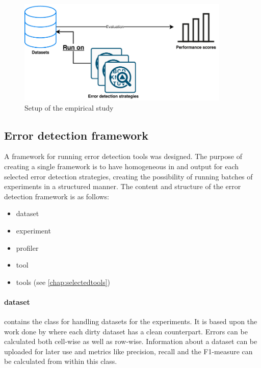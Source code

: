\begin{figure}[h]
    \centering
    \includegraphics[width=0.9\textwidth]{thesis/Figures/Method/PerformanceEstimation-Experiment.pdf}
    \caption{Setup of the empirical study}
    \label{fig:empiricalsetup}
\end{figure}

\subsection{Error detection framework}
A framework for running error detection tools was designed. The purpose of creating a single framework is to have homogeneous in and output for each selected error detection strategies, creating the possibility of running batches of experiments in a structured manner. 
The content and structure of the error detection framework is as follows:
\begin{itemize}[label=]
\item dataset
\item experiment
\item profiler
\item tool
\item tools (see \autoref{chap:selectedtools})
\end{itemize}

\paragraph{dataset} contains the class for handling datasets for the experiments. It is based upon the work done by \cite{Mahdavi2019-zf} where each dirty dataset has a clean counterpart. Errors can be calculated both cell-wise as well as row-wise. Information about a dataset can be uploaded for later use and metrics like precision, recall and the F1-measure can be calculated from within this class.

